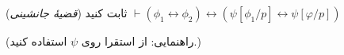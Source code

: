 (\emph{قضیهٔ جانشینی})
ثابت کنید $\vdash(\phi_1\leftrightarrow\phi_2)\leftrightarrow(\psi[\phi_1/p]\leftrightarrow\psi[\varphi/p])$

(راهنمایی: از استقرا روی $\psi$ استفاده کنید.)
